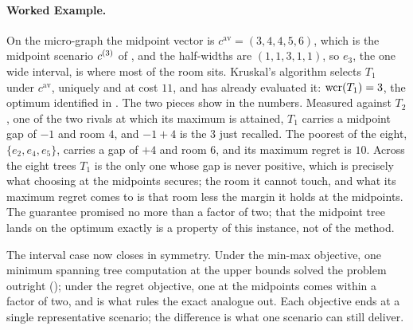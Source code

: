 \paragraph{Worked Example.}

On the micro-graph the midpoint vector is $c^{\mathrm{av}} = (3, 4, 4, 5, 6)$, which is the midpoint scenario $c^{(3)}$ of , and the half-widths are $(1, 1, 3, 1, 1)$, so $e_3$, the one wide interval, is where most of the room sits.
Kruskal's algorithm selects $T_1$ under $c^{\mathrm{av}}$, uniquely and at cost $11$, and  has already evaluated it: $\mathrm{wcr}(T_1) = 3$, the optimum identified in .
The two pieces show in the numbers.
Measured against $T_2$, one of the two rivals at which its maximum is attained, $T_1$ carries a midpoint gap of $-1$ and room $4$, and $-1 + 4$ is the $3$ just recalled.
The poorest of the eight, $\{e_2, e_4, e_5\}$, carries a gap of $+4$ and room $6$, and its maximum regret is $10$.
Across the eight trees $T_1$ is the only one whose gap is never positive, which is precisely what choosing at the midpoints secures; the room it cannot touch, and what its maximum regret comes to is that room less the margin it holds at the midpoints.
The guarantee promised no more than a factor of two; that the midpoint tree lands on the optimum exactly is a property of this instance, not of the method.

The interval case now closes in symmetry.
Under the min-max objective, one minimum spanning tree computation at the upper bounds solved the problem outright (); under the regret objective, one at the midpoints comes within a factor of two, and  is what rules the exact analogue out.
Each objective ends at a single representative scenario; the difference is what one scenario can still deliver.

